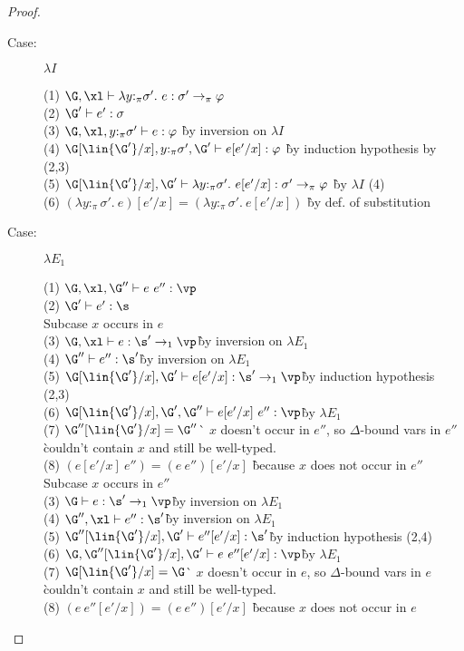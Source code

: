 \begin{proof}
\begin{description}
\item[Case:] $\lambda I$
\begin{tabbing}
  (1) $\G, \xl \vdash \lambda y{:}_\pi\sigma'.~e : \sigma' \to_\pi \varphi$\\
  (2) $\G' \vdash e' : \sigma$\\
  (3) $\G, \xl, y{:}_\pi\sigma' \vdash e : \varphi$ \` by inversion on $\lambda I$\\
  (4) $\G[\lin{\G'}/x], y{:}_\pi\sigma', \G' \vdash e[e'/x] : \varphi$ \` by induction hypothesis by (2,3)\\
  (5) $\G[\lin{\G'}/x], \G' \vdash \lambda y{:}_\pi\sigma'.~e[e'/x] : \sigma' \to_\pi \varphi$ \` by $\lambda I$ (4)\\
  (6) $(\lambda y{:}_\pi\sigma'.~e)[e'/x] = (\lambda y{:}_\pi\sigma'.~e[e'/x])$ \` by def. of substitution\\
\end{tabbing}

\item[Case:] $\lambda E_1$
\begin{tabbing}
  (1) $\G, \xl, \G'' \vdash e~e'' : \vp$\\
  (2) $\G' \vdash e' : \s$\\
  Subcase $x$ occurs in $e$\\
  (3) $\G, \xl \vdash e : \s' \to_1 \vp$\` by inversion on $\lambda E_1$\\
  (4) $\G'' \vdash e'' : \s'$\` by inversion on $\lambda E_1$\\
  (5) $\G[\lin{\G'}/x], \G' \vdash e[e'/x] : \s' \to_1 \vp$\` by induction hypothesis (2,3)\\
  (6) $\G[\lin{\G'}/x], \G', \G'' \vdash e[e'/x]~e'' : \vp$\` by $\lambda E_1$\\
  (7) $\G''[\lin{\G'}/x] = \G''$\` $x$ doesn't occur in $e''$, so $\Delta$-bound vars in $e''$ \\
      \` couldn't contain $x$ and still be well-typed.\\
  (8) $(e[e'/x]~e'') = (e~e'')[e'/x]$ \` because $x$ does not occur in $e''$\\
  Subcase $x$ occurs in $e''$\\
  (3) $\G \vdash e : \s' \to_1 \vp$\` by inversion on $\lambda E_1$\\
  (4) $\G'', \xl \vdash e'' : \s'$\` by inversion on $\lambda E_1$\\
  (5) $\G''[\lin{\G'}/x], \G' \vdash e''[e'/x] : \s'$\` by induction hypothesis (2,4)\\
  (6) $\G, \G''[\lin{\G'}/x], \G' \vdash e~e''[e'/x] : \vp$\` by $\lambda E_1$\\
  (7) $\G[\lin{\G'}/x] = \G$\` $x$ doesn't occur in $e$, so $\Delta$-bound vars in $e$ \\
      \` couldn't contain $x$ and still be well-typed.\\
  (8) $(e~e''[e'/x]) = (e~e'')[e'/x]$ \` because $x$ does not occur in $e$\\
\end{tabbing}


\end{description}
\end{proof}
